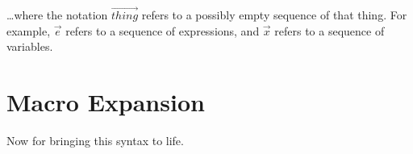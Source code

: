 \documentclass[nocopyrightspace]{sigplanconf}
\begin{document}
\ldots where the notation $\overrightarrow{thing}$ refers to a possibly empty sequence of that thing.
For example, $\vec{e}$ refers to a sequence of expressions, and $\vec{x}$ refers to a sequence of variables.

\section{Macro Expansion}
Now for bringing this syntax to life.
\end{document}
